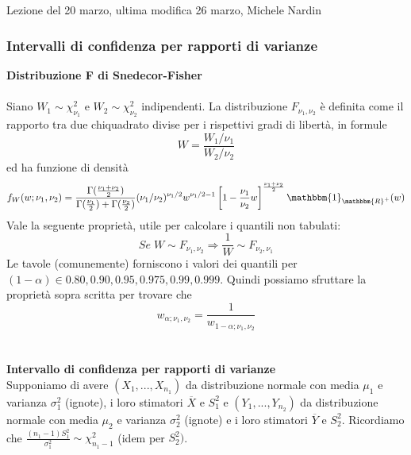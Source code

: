 \\ \\
Lezione del 20 marzo, ultima modifica 26 marzo, Michele Nardin

\subsubsection{Intervalli di confidenza per rapporti di varianze}

\textbf{Distribuzione F di Snedecor-Fisher}
\\ \\
Siano $W_1 \sim \chi^2_{\nu_1}$ e $W_2 \sim \chi^2_{\nu_2}$ indipendenti.
La distribuzione $F_{\nu_1,\nu_2}$ è definita come il rapporto tra due chiquadrato divise per i
rispettivi gradi di libertà, in formule $$W=\frac{W_1/\nu_{1}}{W_2/\nu_{2}}$$ ed ha funzione di densità $$f_W(w;\nu_1,\nu_2)=\frac{\Gamma(\frac{\nu_1 + \nu_2}{2})}{\Gamma(\frac{\nu_1}{2})+\Gamma(\frac{\nu_2}{2})} (\nu_1 / \nu_2)^{\nu_1 / 2} w^{\nu_1 / 2 - 1} \left[ 1 - \frac{\nu_1}{\nu_2} w  \right]^{\frac{\nu_1 + \nu_2}{2}} \mathbbm{1}_{\mathbbm{R}^+} (w)$$
Vale la seguente proprietà, utile per calcolare i quantili non tabulati:
$$Se \; W \sim F_{\nu_1,\nu_2} \Rightarrow \frac{1}{W} \sim F_{\nu_2,\nu_1}$$
Le tavole (comunemente) forniscono i valori dei quantili per $(1-\alpha) \in {0.80,0.90,0.95,0.975,0.99,0.999}$. Quindi possiamo sfruttare la proprietà sopra scritta per trovare che $$w_{\alpha;\nu_1,\nu_2}=\frac{1}{w_{1-\alpha;\nu_1,\nu_2}}$$
\\ \\
\textbf{Intervallo di confidenza per rapporti di varianze}
\\
 Supponiamo di avere $(X_1,...,X_{n_1})$ da distribuzione normale con media $\mu_1$ e varianza $\sigma_1^2$ (ignote), i loro stimatori $\overline{X}$ e $S^2_1$ e
 $(Y_1,...,Y_{n_2})$ da distribuzione normale con media $\mu_2$ e varianza $\sigma_2^2$ (ignote) e i loro stimatori $\overline{Y}$ e $S^2_2$.
 Ricordiamo che $\frac{(n_1-1)S^2_1}{\sigma^2_1} \sim \chi^2_{n_1 - 1}$ (idem per $S^2_2)$.
 
